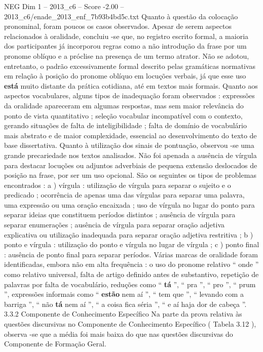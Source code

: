 \begin{textsample}{NEG Dim 1 – 2013\_c6 – Score -2.00 – 2013\_c6/enade\_2013\_enf\_7b93b4bd5c.txt}
Quanto à questão da colocação pronominal, foram poucos os casos observados.
Apesar de serem aspectos relacionados à oralidade, concluiu -se que, no registro escrito formal, a maioria dos participantes já incorporou regras como a não introdução da frase por um pronome oblíquo e a próclise na presença de um termo atrator.
Não se adotou, entretanto, o padrão excessivamente formal descrito pelas gramáticas normativas em relação à posição do pronome oblíquo em locuções verbais, já que esse uso \textbf{está} muito distante da prática cotidiana, até em textos mais formais.
Quanto aos aspectos vocabulares, alguns tipos de inadequação foram observados : expressões da oralidade apareceram em algumas respostas, mas sem maior relevância do ponto de vista quantitativo ; seleção vocabular incompatível com o contexto, gerando situações de falta de inteligibilidade ; falta de domínio de vocabulário mais abstrato e de maior complexidade, essencial ao desenvolvimento do texto de base dissertativa.
Quanto à utilização dos sinais de pontuação, observou -se uma grande precariedade nos textos analisados.
Não foi apenada a ausência de vírgula para destacar locuções ou adjuntos adverbiais de pequena extensão deslocados de posição na frase, por ser um uso opcional.
São os seguintes os tipos de problemas encontrados : a ) vírgula : utilização de vírgula para separar o sujeito e o predicado ; ocorrência de apenas uma das vírgulas para separar uma palavra, uma expressão ou uma oração encaixada ; uso de vírgula no lugar do ponto para separar ideias que constituem períodos distintos ; ausência de vírgula para separar enumerações ; ausência de vírgula para separar oração adjetiva explicativa ou utilização inadequada para separar oração adjetiva restritiva ; b ) ponto e vírgula : utilização do ponto e vírgula no lugar de vírgula ; c ) ponto final : ausência de ponto final para separar períodos.
Várias marcas de oralidade foram identificadas, embora não em alta frequência : o uso do pronome relativo “ onde ” como relativo universal, falta de artigo definido antes de substantivo, repetição de palavras por falta de vocabulário, reduções como “ \textbf{tá} ”, “ pra ”, “ pro ”, “ prum ”, expressões informais como “ \textbf{estão} nem aí ”, “ tem que ”, “ levando com a barriga ”, “ não \textbf{tá} nem aí ”, “ a coisa fica séria ”, “ e aí haja dor de cabeça ”. 3.3.2 Componente de Conhecimento Específico Na parte da prova relativa às questões discursivas no Componente de Conhecimento Específico ( Tabela 3.12 ), observa -se que a média foi mais baixa do que nas questões discursivas do Componente de Formação Geral.

\end{textsample}
